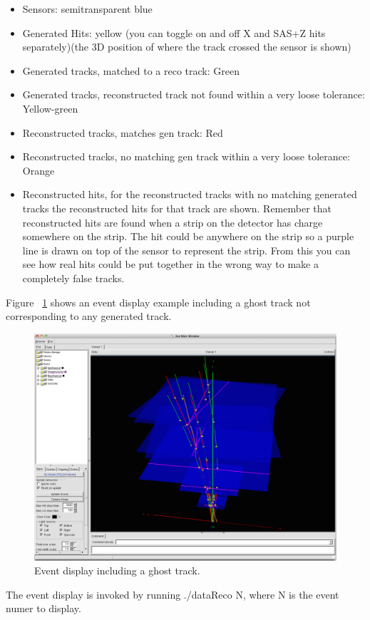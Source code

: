 \documentclass[aps,prd,superscriptaddress,floatfix]{revtex4}
\begin{document}
\begin{itemize}
\item Sensors: semitransparent blue

\item Generated Hits: yellow  (you can toggle on and off X and SAS+Z hits separately)(the 3D position of where the track crossed the sensor is shown)

\item Generated tracks, matched to a reco track: Green

\item Generated tracks, reconstructed track not found within a very loose tolerance: Yellow-green

\item Reconstructed tracks, matches gen track: Red

\item Reconstructed tracks, no matching gen track within a very loose tolerance: Orange

\item Reconstructed hits, for the reconstructed tracks with no matching generated tracks the reconstructed hits for that track are shown.  Remember that reconstructed hits are found when a strip on the detector has charge somewhere on the strip.   The hit could be anywhere on the strip so a purple line is drawn on top of the sensor to represent the strip.  From this you can see how real hits could be put together in the wrong way to make a completely false tracks.   
\end{itemize}


Figure ~\ref{fig:eventdisplay} shows an event display example including
a ghost track not corresponding to any generated track.

\begin{figure}[hbtp]
  \begin{center}
    \includegraphics[width=17.0cm]{eventdisplay.png}
   \caption{Event display including a ghost track.}
    \label{fig:eventdisplay}
  \end{center}
\end{figure}

The event display is invoked by running ./dataReco N, where N is the
event numer to display.
\end{document}
